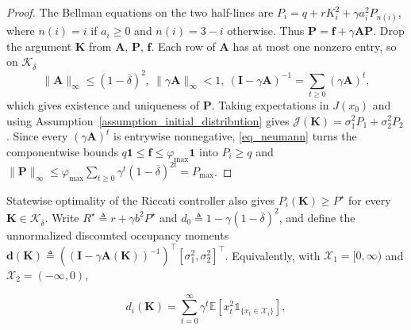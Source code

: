 \documentclass[letterpaper, 10 pt, conference]{ieeeconf}
\newcommand{\E}{\mathbb{E}}
\newcommand{\mbf}{\mathbf{f}}
\newcommand{\bA}{\mathbf{A}}
\newcommand{\bI}{\mathbf{I}}
\newcommand{\bK}{\mathbf{K}}
\newcommand{\bP}{\mathbf{P}}
\newcommand{\cJ}{\mathcal{J}}
\newcommand{\cK}{\mathcal{K}}
\newcommand{\cX}{\mathcal{X}}
\newcommand{\ind}[1]{\mathds{1}_{#1}}
\newcommand{\Assum}{Assumption}
\begin{document}
\begin{proof}
    The Bellman equations on the two half-lines are
    $P_i=q+rK_i^2+\gamma a_i^2P_{n(i)}$, where $n(i)=i$ if $a_i\ge0$ and $n(i)= 3 -i$ otherwise. Thus $\bP=\mbf+\gamma\bA\bP$. Drop the argument $\bK$ from $\bA$, $\bP$, $\mbf$. Each
    row of $\bA$ has at most one nonzero entry, so on $\cK_{\overline{\delta}}$
    \begin{equation} \label{eq_neumann}
    \|\bA\|_{\infty}{\le}(1{-}\overline\delta)^2,
        \ \|\gamma\bA\|_{\infty}{<}1, \ (\bI{-}\gamma\bA)^{{-}1}{=}\sum_{t\ge0}(\gamma\bA)^t,
    \end{equation}
    which gives existence and uniqueness of $\bP$. Taking expectations in $J(x_{0})$ and using
    \Assum~\ref{assumption_initial_distribution} gives
    $\cJ(\bK) = \sigma_{1}^{2}P_{1} + \sigma_{2}^{2}P_{2}$. Since every $(\gamma\bA)^{t}$ is
    entrywise nonnegative, \eqref{eq_neumann} turns the componentwise bounds
    $q\mathbf{1} \le \mbf \le \varphi_{\max}\mathbf{1}$ into $P_{i} \ge q$ and
    $\|\bP\|_{\infty} \le \varphi_{\max}\sum_{t\ge0}\gamma^{t}(1{-}\overline{\delta})^{2t} = P_{\max}$.
\end{proof}
 
Statewise optimality of the Riccati controller also gives $P_i(\bK)\ge P^{\star}$ for every $\bK\in\cK_{\overline\delta}$. Write $R^{\star}\triangleq r+\gamma b^{2}P^{\star}$ and $d_{0}\triangleq1-\gamma(1-\overline\delta)^{2}$, and define the unnormalized discounted occupancy moments $\mathbf d(\bK)\triangleq ((\bI-\gamma\bA(\bK))^{-1})^{\top}
       [\sigma_1^2,\sigma_2^2]^{\top}$.
Equivalently, with $\cX_1=[0,\infty)$ and $\cX_2=(-\infty,0)$,

\vspace{-0.3cm}
\[
d_i(\bK)=\sum_{t=0}^{\infty}\gamma^t
 \E\!\left[x_t^2\ind{\{x_t\in\cX_i\}}\right],
\]
\vspace{-0.3cm}
\end{document}
